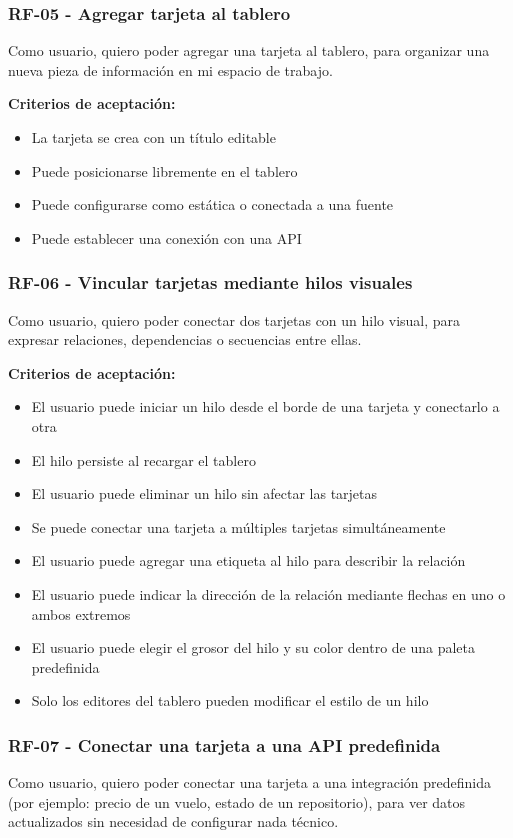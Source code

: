 \subsubsection*{RF-05 - Agregar tarjeta al tablero}
Como usuario, quiero poder agregar una tarjeta al tablero, para organizar una nueva pieza de información en mi espacio de trabajo.

\textbf{Criterios de aceptación:}
\begin{itemize}
  \item La tarjeta se crea con un título editable
  \item Puede posicionarse libremente en el tablero
  \item Puede configurarse como estática o conectada a una fuente
  \item Puede establecer una conexión con una API
\end{itemize}

\subsubsection*{RF-06 - Vincular tarjetas mediante hilos visuales}
Como usuario, quiero poder conectar dos tarjetas con un hilo visual, para expresar relaciones, dependencias o secuencias entre ellas.

\textbf{Criterios de aceptación:}
\begin{itemize}
  \item El usuario puede iniciar un hilo desde el borde de una tarjeta y conectarlo a otra
  \item El hilo persiste al recargar el tablero
  \item El usuario puede eliminar un hilo sin afectar las tarjetas
  \item Se puede conectar una tarjeta a múltiples tarjetas simultáneamente
  \item El usuario puede agregar una etiqueta al hilo para describir la relación
  \item El usuario puede indicar la dirección de la relación mediante flechas en uno o ambos extremos
  \item El usuario puede elegir el grosor del hilo y su color dentro de una paleta predefinida
  \item Solo los editores del tablero pueden modificar el estilo de un hilo
\end{itemize}

\subsubsection*{RF-07 - Conectar una tarjeta a una API predefinida}
Como usuario, quiero poder conectar una tarjeta a una integración predefinida (por ejemplo: precio de un vuelo, estado de un repositorio), para ver datos actualizados sin necesidad de configurar nada técnico.

